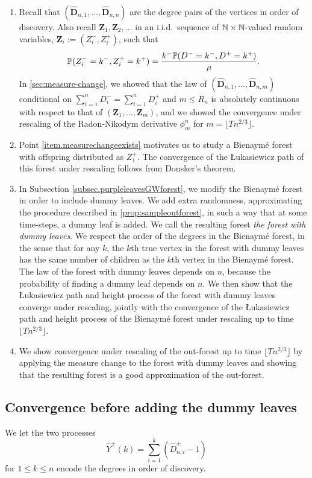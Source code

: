 \begin{enumerate}
    \item \label{item.measurechangeexists} Recall that $(\mathbf{\hat{D}}_{n,1},\dots,\mathbf{\hat{D}}_{n,n})$ are the degree pairs of the vertices in order of discovery. Also recall $\mathbf{Z}_1, \mathbf{Z}_2, \ldots$ in an i.i.d.\ sequence of $\N\times \N$-valued random variables, $\mathbf{Z}_i:=(Z_i^-,Z_i^+)$, such that 
    $$\P(Z_i^-=k^-, Z_i^+=k^+)=\frac{k^-\P(D^-=k^-,D^+=k^+)}{\mu}.$$
    In \cref{sec:measure-change}, we showed that the law of $(\mathbf{\hat{D}}_{n,1},\dots,\mathbf{\hat{D}}_{n,m})$ conditional on $\sum_{i=1}^n D_i^-=\sum_{i=1}^n D_i^+$ and $m \leq R_n$ is absolutely continuous with respect to that of $(\mathbf{Z}_1,\dots, \mathbf{Z}_m)$, and we showed the convergence under rescaling of the Radon-Nikodym derivative $\phi_m^n$ for $m=\lfloor T n^{2/3}\rfloor$. 
    \item Point \ref{item.measurechangeexists} motivates us to study a Bienaymé forest with offspring distributed as $Z_1^+$. The convergence of the \L ukasiewicz path of this forest under rescaling follows from Donsker's theorem.
    \item In Subsection \ref{subsec.purpleleavesGWforest}, we modify the Bienaymé forest in order to include dummy leaves. We add extra randomness, approximating the procedure described in \cref{prop:sampleoutforest}, in such a way that at some time-steps, a dummy leaf is added. We call the resulting forest \emph{the forest with dummy leaves}. We respect the order of the degrees in the Bienaymé forest, in the sense that for any $k$, the $k$th true vertex in the forest with dummy leaves has the same number of children as the $k$th vertex in the Bienaymé forest. The law of the forest with dummy leaves depends on $n$, because the probability of finding a dummy leaf depends on $n$. We then show that the \L ukasiewicz path and height process of the forest with dummy leaves converge under rescaling, jointly with the convergence of the \L ukasiewicz path and height process of the Bienaymé forest under rescaling up to time $\lfloor T n^{2/3}\rfloor$.
    \item We show convergence under rescaling of the out-forest up to time $\lfloor T n^{2/3}\rfloor$ by applying the measure change to the forest with dummy leaves and showing that the resulting forest is a good approximation of the out-forest. 
\end{enumerate}

\subsection{Convergence before adding the dummy leaves}
We let the two processes
$$ \hat{Y}^{\pm}(k)=\sum\limits_{i=1}^k (\hat{D}^{\pm}_{n,i}-1)$$
for $1\leq k\leq n$ encode the degrees in order of discovery.

